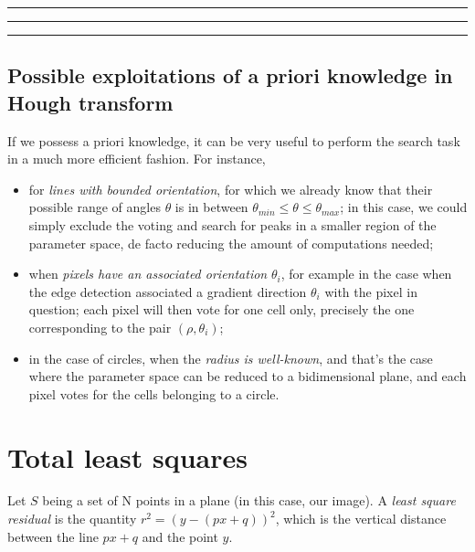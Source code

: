 \documentclass[10pt]{report}
\begin{document}
\vspace*{0.6cm}\hrule
\hrule
\hrule
\vspace*{0.4cm}

\subsection{Possible exploitations of a priori knowledge in Hough transform}
\label{possible-exploitations-of-a-priori-knowledge-in-hough-transform}
If we possess a priori knowledge, it can be very useful to perform the
search task in a much more efficient fashion. For instance,

\begin{itemize}
\item for \emph{lines with bounded orientation}, for which we already know that
their possible range of angles \(\theta\) is in between
\(\theta_{min} \leq \theta \leq \theta_{max}\); in this case, we could
simply exclude the voting and search for peaks in a smaller region of
the parameter space, de facto reducing the amount of computations
needed;
\item when \emph{pixels have an associated orientation} \(\theta_i\), for example
in the case when the edge detection associated a gradient direction
\(\theta_i\) with the pixel in question; each pixel will then vote for
one cell only, precisely the one corresponding to the pair
\((\rho, \theta_i)\);
\item in the case of circles, when the \emph{radius is well-known}, and that's
the case where the parameter space can be reduced to a bidimensional
plane, and each pixel votes for the cells belonging to a circle.
\end{itemize}

\section{Total least squares}
\label{total-least-squares}
Let \(S\) being a set of N points in a plane (in this case, our image).
A \emph{least square residual} is the quantity \(r^2 = (y - (px + q))^2\),
which is the vertical distance between the line \(px + q\) and the point
\(y\).
\end{document}
